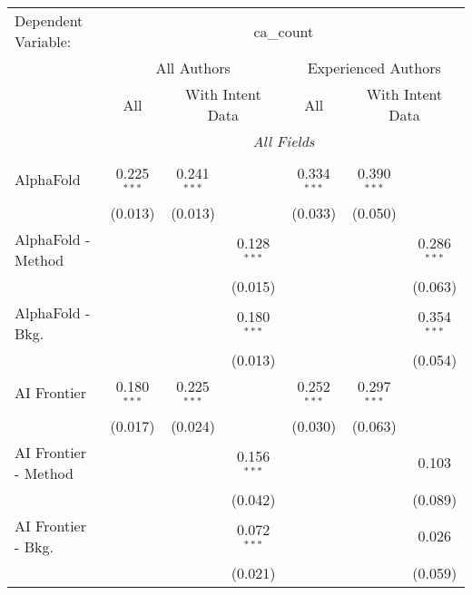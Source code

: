 \begingroup
\centering
\begin{tabular}{lcccccc}
   \tabularnewline \midrule \midrule
   Dependent Variable: & \multicolumn{6}{c}{ca\_count}\\
 & \multicolumn{3}{c}{All Authors} & \multicolumn{3}{c}{Experienced Authors} \\
\cmidrule(lr){2-4} \cmidrule(lr){5-7}
 & \multicolumn{1}{c}{All} & \multicolumn{2}{c}{With Intent Data} & \multicolumn{1}{c}{All} & \multicolumn{2}{c}{With Intent Data} \\
\cmidrule(lr){2-2} \cmidrule(lr){3-4} \cmidrule(lr){5-5} \cmidrule(lr){6-7}
 & \multicolumn{6}{c}{\textit{All Fields}} \\ \\
   AlphaFold            & 0.225$^{***}$ & 0.241$^{***}$ &               & 0.334$^{***}$ & 0.390$^{***}$ &   \\   
                        & (0.013)       & (0.013)       &               & (0.033)       & (0.050)       &   \\   
   AlphaFold - Method   &               &               & 0.128$^{***}$ &               &               & 0.286$^{***}$\\   
                        &               &               & (0.015)       &               &               & (0.063)\\   
   AlphaFold - Bkg.     &               &               & 0.180$^{***}$ &               &               & 0.354$^{***}$\\   
                        &               &               & (0.013)       &               &               & (0.054)\\   
   AI Frontier          & 0.180$^{***}$ & 0.225$^{***}$ &               & 0.252$^{***}$ & 0.297$^{***}$ &   \\   
                        & (0.017)       & (0.024)       &               & (0.030)       & (0.063)       &   \\   
   AI Frontier - Method &               &               & 0.156$^{***}$ &               &               & 0.103\\   
                        &               &               & (0.042)       &               &               & (0.089)\\   
   AI Frontier - Bkg.   &               &               & 0.072$^{***}$ &               &               & 0.026\\   
                        &               &               & (0.021)       &               &               & (0.059)\\   

\end{tabular}
